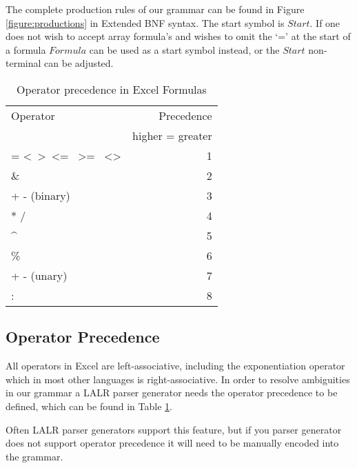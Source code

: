 \documentclass[conference]{IEEEtran}
\begin{document}
The complete production rules of our grammar can be found in Figure \ref{figure:productions} in Extended BNF syntax. The start symbol is $Start$. If one does not wish to accept array formula's and wishes to omit the `=' at the start of a formula $Formula$ can be used as a start symbol instead, or the $Start$ non-terminal can be adjusted.

\begin{table}
\label{table:operatorprec}
\caption{Operator precedence in Excel Formulas}
\begin{tabular}{lr}
Operator                                                                & Precedence \\
 & higher = greater \\
= \textless \  \textgreater \  \textless= \  \textgreater= \  \textless\textgreater & 1          \\
\&                                                                      & 2          \\
+ - (binary)                                                            & 3          \\
* /                                                                     & 4          \\
\textasciicircum                                                        & 5          \\
\%                                                                      & 6          \\
+ - (unary)                                                             & 7          \\
: \texttt{\char32}                                                             & 8         
\end{tabular}
\end{table}

\subsection{Operator Precedence}

All operators in Excel are left-associative, including the exponentiation operator which in most other languages is right-associative.
In order to resolve ambiguities in our grammar a LALR parser generator needs the operator precedence to be defined, which can be found in Table \ref{table:operatorprec}.

Often LALR parser generators support this feature, but if you parser generator does not support operator precedence it will need to be manually encoded into the grammar.
\end{document}
